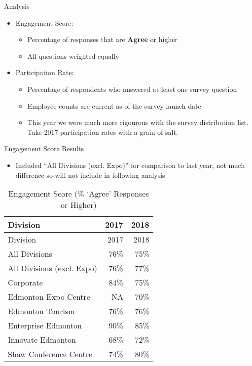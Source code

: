 \documentclass[handout]{beamer}
\providecommand{\tightlist}{%
  \setlength{\itemsep}{0pt}\setlength{\parskip}{0pt}}
\begin{document}
\begin{frame}{Analysis}
\protect\hypertarget{analysis}{}

\begin{itemize}
\tightlist
\item
  Engagement Score:

  \begin{itemize}
  \tightlist
  \item
    Percentage of responses that are \textbf{Agree} or higher
  \item
    All questions weighted equally
  \end{itemize}
\item
  Participation Rate:

  \begin{itemize}
  \tightlist
  \item
    Percentage of respondents who answered at least one survey question
  \item
    Employee counts are current as of the survey launch date
  \item
    This year we were much more rigourous with the survey distribution
    list. Take 2017 participation rates with a grain of salt.
  \end{itemize}
\end{itemize}

\end{frame}

\begin{frame}{Engagement Score Results}
\protect\hypertarget{engagement-score-results}{}

\begin{itemize}
\tightlist
\item
  Included ``All Divisions (excl. Expo)'' for comparison to last year,
  not much difference so will not include in following analysis
\end{itemize}

\begin{longtable}[]{@{}lrr@{}}
\caption{Engagement Score (\% `Agree' Responses or
Higher)}\tabularnewline
\toprule
Division & 2017 & 2018\tabularnewline
\midrule
\endfirsthead
\toprule
Division & 2017 & 2018\tabularnewline
\midrule
\endhead
All Divisions & 76\% & 75\%\tabularnewline
All Divisions (excl. Expo) & 76\% & 77\%\tabularnewline
Corporate & 84\% & 75\%\tabularnewline
Edmonton Expo Centre & NA & 70\%\tabularnewline
Edmonton Tourism & 76\% & 76\%\tabularnewline
Enterprise Edmonton & 90\% & 85\%\tabularnewline
Innovate Edmonton & 68\% & 72\%\tabularnewline
Shaw Conference Centre & 74\% & 80\%\tabularnewline
\bottomrule
\end{longtable}

\end{frame}
\end{document}
